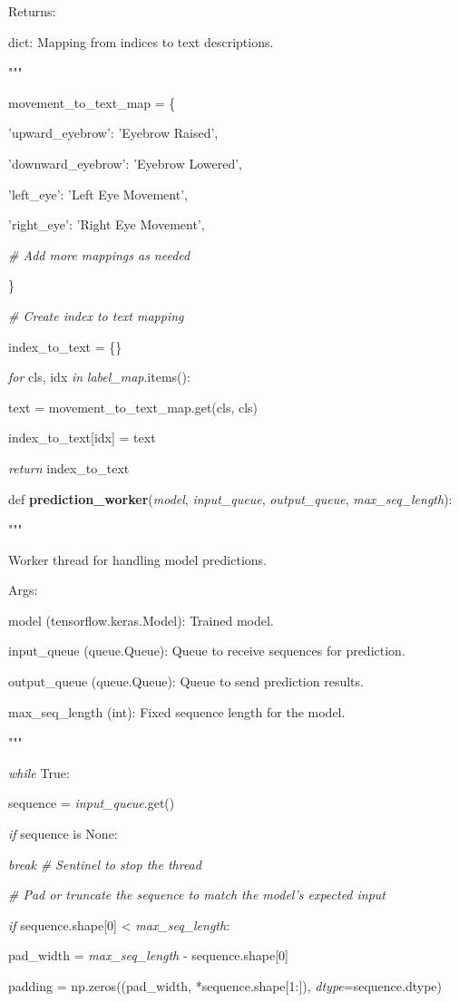 \documentclass[
]{article}
\begin{document}
Returns:

dict: Mapping from indices to text descriptions.

"""

movement\_to\_text\_map = \{

'upward\_eyebrow': 'Eyebrow Raised',

'downward\_eyebrow': 'Eyebrow Lowered',

'left\_eye': 'Left Eye Movement',

'right\_eye': 'Right Eye Movement',

\emph{\# Add more mappings as needed}

\}

\emph{\# Create index to text mapping}

index\_to\_text = \{\}

\emph{for} cls, idx \emph{in} \emph{label\_map}.items():

text = movement\_to\_text\_map.get(cls, cls)

index\_to\_text{[}idx{]} = text

\emph{return} index\_to\_text

def \textbf{prediction\_worker}(\emph{model}, \emph{input\_queue}, \emph{output\_queue}, \emph{max\_seq\_length}):

"""

Worker thread for handling model predictions.

Args:

model (tensorflow.keras.Model): Trained model.

input\_queue (queue.Queue): Queue to receive sequences for prediction.

output\_queue (queue.Queue): Queue to send prediction results.

max\_seq\_length (int): Fixed sequence length for the model.

"""

\emph{while} True:

sequence = \emph{input\_queue}.get()

\emph{if} sequence is None:

\emph{break} \emph{\# Sentinel to stop the thread}

\emph{\# Pad or truncate the sequence to match the model's expected input}

\emph{if} sequence.shape{[}0{]} \textless{} \emph{max\_seq\_length}:

pad\_width = \emph{max\_seq\_length} - sequence.shape{[}0{]}

padding = np.zeros((pad\_width, *sequence.shape{[}1:{]}), \emph{dtype}=sequence.dtype)
\end{document}
